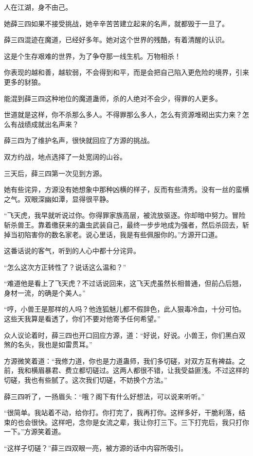 \begin{this_body}
人在江湖，身不由己。

她薛三四如果不接受挑战，她辛辛苦苦建立起来的名声，就都毁于一旦了。

薛三四混迹在魔道，已经好多年。她对这个世界的残酷，有着清醒的认识。

这是个生存艰难的世界，为了争夺那一线生机。万物相杀！

你表现的越和善，越软弱，不会得到和平，而是会把自己陷入更危险的境界，引来更多的豺狼。

能混到薛三四这种地位的魔道蛊师，杀的人绝对不会少，得罪的人更多。

世道就是这样，你不杀那么多人。不得罪那么多人，怎么有资源堆砌出实力来？怎么有战绩成就出名声来？

薛三四为了维护名声，很快就回应了方源的挑战。

双方约战，地点选择了一处宽阔的山谷。

三天后，薛三四第一次见到方源。

她有些诧异，方源没有她想象中那种凶横的样子，反而有些清秀。没有一丝的蛮横之气。双眼深幽如潭，显得很平静。

“飞天虎，我早就听说过你。你得罪家族高层，被流放驱逐。你却暗中努力。冒险斩杀兽王。靠着缴获来的蛊虫武装自己，最终一步步地成为强者，然后杀回去，斩掉当初陷害你的数名家老。说心里话，我是有些佩服你的。”方源开口道。

这番话说的客气，听到的人心中都十分诧异。

“怎么这次方正转性了？说话这么温和？”

“难道他是看上了飞天虎？不过话说回来，这飞天虎虽然长相普通，但前凸后翘，身材一流，的确是个美人。”

“哼，小兽王是那样的人吗？他连狐魅儿都不假辞色，此人狠毒冷血，十分可怕。这些天我算是看透了，你们不要对他寄予任何希望。”

众人议论着时，薛三四也开口回应方源，道：“好说，好说。小兽王，你们黑白双煞的名头，我也是如雷贯耳。”

方源微笑着道：“我修力道，你也是力道蛊师，我们多切磋，对双方互有裨益。之前，我和横眉暴君、费立都切磋过。这两人都很不错，让我受益匪浅。不过这样的切磋，我也有些腻了。这次我们切磋，不妨换个方法。”

薛三四听了，一扬眉头：“哦？阁下有什么好想法，可以说来听听。”

“很简单。我站着不动，给你打。你打完了，我再打你。这样多好，干脆利落，结束的也会很快。这样吧，念你是女流之辈，我让你打三下。三下打完后，我只打你一下。”方源笑着道。

“这样子切磋？”薛三四双眼一亮，被方源的话中内容所吸引。


\end{this_body}
